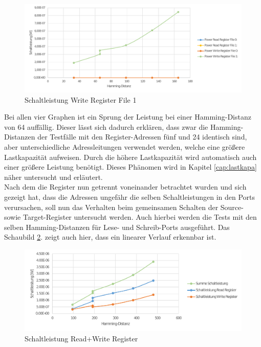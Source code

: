 \begin{figure}[H]
	\centering
	\includegraphics[width=\textwidth]{fig/register_eval_target_port1.pdf}
	\caption{Schaltleistung Write Register File 1}
	\label{fig:target1_power}
\end{figure}

Bei allen vier Graphen ist ein Sprung der Leistung bei einer Hamming-Distanz von 64 auffällig. Dieser lässt sich dadurch erklären, dass zwar die Hamming-Distanzen der Testfälle mit den Register-Adressen fünf und 24 identisch sind, aber unterschiedliche Adressleitungen verwendet werden, welche eine größere Lastkapazität aufweisen. Durch die höhere Lastkapazität wird automatisch auch einer größere Leistung benötigt. Dieses Phänomen wird in Kapitel \ref{cap:lastkapa} näher untersucht und erläutert.\\
Nach dem die Register nun getrennt voneinander betrachtet wurden und sich gezeigt hat, dass die Adressen ungefähr die selben Schaltleistungen in den Ports verursachen, soll nun das Verhalten beim gemeinsamen Schalten der Source- sowie Target-Register untersucht werden. Auch hierbei werden die Tests mit den selben Hamming-Distanzen für Lese- und Schreib-Ports ausgeführt. Das Schaubild \ref{fig:source_target_power}. zeigt auch hier, dass ein linearer Verlauf erkennbar ist.

\begin{figure}[H]
	\centering
	\includegraphics[width=\textwidth]{fig/source_target_power.pdf}
	\caption{Schaltleistung Read+Write Register}
	\label{fig:source_target_power}
\end{figure}

